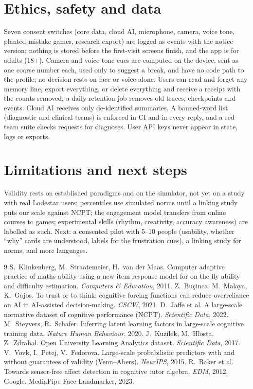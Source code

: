 \documentclass[10pt,a4paper]{article}
\begin{document}
\section{Ethics, safety and data}
Seven consent switches (core data, cloud AI, microphone, camera, voice tone, planted-mistake games,
research export) are logged as events with the notice version; nothing is stored before the
first-visit screens finish, and the app is for adults (18+). Camera and voice-tone cues are computed
on the device, sent as one coarse number each, used only to suggest a break, and have no code path to
the profile; no decision rests on face or voice alone. Users can read and forget any memory line,
export everything, or delete everything and receive a receipt with the counts removed; a daily
retention job removes old traces, checkpoints and events. Cloud AI receives only de-identified
summaries. A banned-word list (diagnostic and clinical terms) is enforced in CI and in every reply,
and a red-team suite checks requests for diagnoses. User API keys never appear in state, logs or
exports.

\section{Limitations and next steps}
Validity rests on established paradigms and on the simulator, not yet on a study with real Lodestar
users; percentiles use simulated norms until a linking study puts our scale against NCPT; the
engagement model transfers from online courses to games; experimental skills (rhythm, creativity,
accuracy awareness) are labelled as such. Next: a consented pilot with 5--10 people (usability, whether
``why'' cards are understood, labels for the frustration cues), a linking study for norms, and more
languages.

\begin{thebibliography}{9}\small
{} S.~Klinkenberg, M.~Straatemeier, H.~van der Maas. Computer adaptive practice of
maths ability using a new item response model for on the fly ability and difficulty estimation.
\emph{Computers \& Education}, 2011.
 Z.~Bu\c{c}inca, M.~Malaya, K.~Gajos. To trust or to think: cognitive forcing functions
can reduce overreliance on AI in AI-assisted decision-making. \emph{CSCW}, 2021.
 D.~Jaffe et al. A large-scale normative dataset of cognitive performance (NCPT).
\emph{Scientific Data}, 2022.
 M.~Steyvers, R.~Schafer. Inferring latent learning factors in large-scale
cognitive training data. \emph{Nature Human Behaviour}, 2020.
 J.~Kuzilek, M.~Hlosta, Z.~Zdrahal. Open University Learning Analytics dataset.
\emph{Scientific Data}, 2017.
 V.~Vovk, I.~Petej, V.~Fedorova. Large-scale probabilistic predictors with and without
guarantees of validity (Venn--Abers). \emph{NeurIPS}, 2015.
 R.~Baker et al. Towards sensor-free affect detection in cognitive tutor algebra.
\emph{EDM}, 2012.
 Google. MediaPipe Face Landmarker, 2023.
\end{thebibliography}
\end{document}

